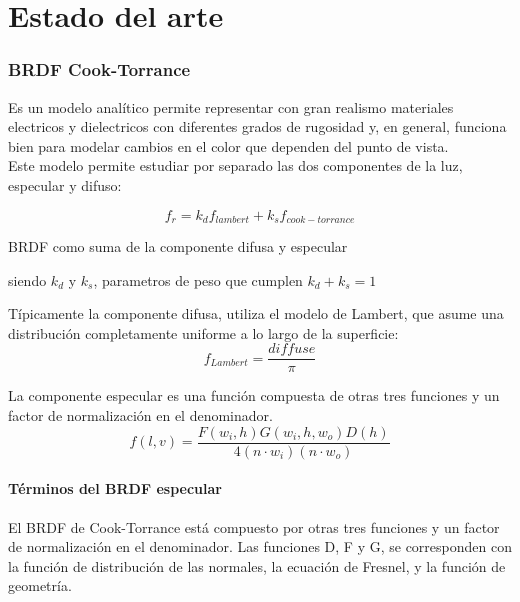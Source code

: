 \chapter{Estado del arte}

\subsection{BRDF Cook-Torrance}
Es un modelo anal\'itico permite representar con gran realismo materiales electricos y dielectricos con diferentes
grados de rugosidad y, en general, funciona bien para modelar cambios en el color que dependen del punto de vista.\\
Este modelo permite estudiar por separado las dos componentes de la luz, especular y difuso:

\begin{eqfloat}[!htb]
    \begin{equation}
        f_r = k_{d}f_{lambert} + k_sf_{cook-torrance}
    \end{equation}
    \caption{BRDF como suma de la componente difusa y especular}
\end{eqfloat}

siendo $k_d$ y $k_s$, parametros de peso que cumplen $k_d + k_s = 1$
\singlespacing

T\'ipicamente la componente difusa, utiliza el modelo de Lambert, que asume una distribuci\'on completamente uniforme a lo
largo de la superficie:\\

\begin{equation}
f_{Lambert} = \frac{diffuse}{\pi}
\end{equation}
\singlespacing

La componente especular es una funci\'on compuesta de otras tres funciones y un factor de normalizaci\'on en el
denominador.\\

\begin{equation}
    f(l, v) = \frac{F(w_i, h) G(w_i, h, w_o) D(h)} {4(n\cdot{w_i}) (n \cdot{w_o})}
\end{equation}
\singlespacing

\subsubsection{T\'erminos del BRDF especular}
    El BRDF de Cook-Torrance est\'a compuesto por otras tres funciones y un factor de normalizaci\'on en el denominador.
    Las funciones D, F y G, se corresponden con la funci\'on de distribuci\'on de las normales, la ecuaci\'on de Fresnel,
    y la funci\'on de geometr\'ia.\\

